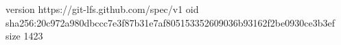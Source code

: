version https://git-lfs.github.com/spec/v1
oid sha256:20c972a980dbccc7e3f87b31e7af805153352609036b93162f2be0930ce3b3ef
size 1423
